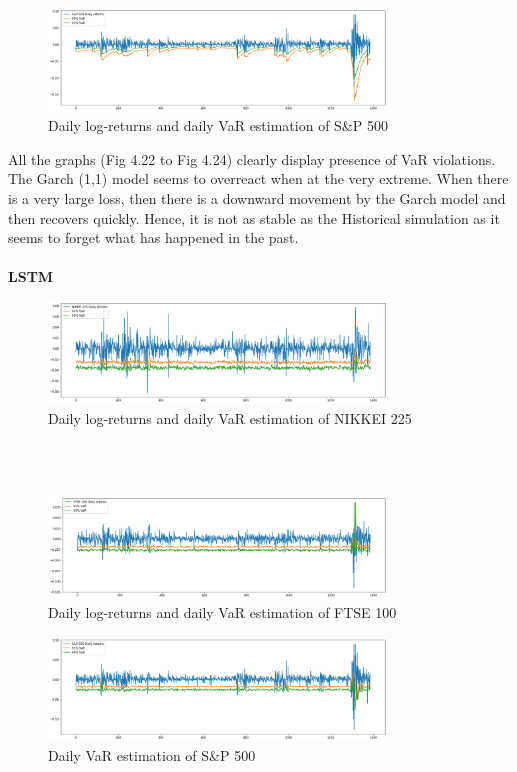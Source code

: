 \documentclass[a4paper,11pt,oneside]{book}
\begin{document}
\begin{figure}[!h]
	\centering
	\includegraphics[width=0.8\textwidth]{figures/GARCHS}
	\caption{Daily log-returns and daily VaR estimation of S\&P 500}
	\label{garchS}
\end{figure}
All the graphs (Fig 4.22 to Fig 4.24) clearly display presence of VaR violations. The Garch (1,1) model seems to overreact when at the very extreme. When there is a very large loss, then there is a downward movement by the Garch model and then recovers quickly. Hence, it is not as stable as the Historical simulation as it seems to forget what has happened in the past.\\\\
\textbf{LSTM}	
\begin{figure}[!h]
	\centering
	\includegraphics[width=0.8\textwidth]{figures/LSTMN}
	\caption{Daily log-returns and daily VaR estimation of NIKKEI 225}
	\label{LSTMN}
\end{figure}\\\\

\begin{figure}[!h]
	\centering
	\includegraphics[width=0.8\textwidth]{figures/LSTMF}
	\caption{Daily log-returns and daily VaR estimation of FTSE 100}
	\label{LSTMF}
\end{figure}

\begin{figure}[!h]
	\centering
	\includegraphics[width=0.8\textwidth]{figures/LSTMS}
	\caption{Daily VaR estimation of S\&P 500}
	\label{LSTMS}
\end{figure}	
\end{document}
